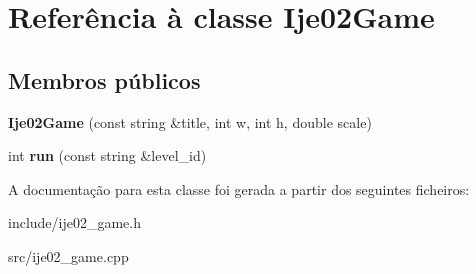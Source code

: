 \hypertarget{classIje02Game}{}\section{Referência à classe Ije02\+Game}
\label{classIje02Game}
\subsection*{Membros públicos}
\begin{DoxyCompactItemize}
\item 
\mbox{\label{classIje02Game_ab31ee909d3cb4344d166f4402467bf93}} 
{\bfseries Ije02\+Game} (const string \&title, int w, int h, double scale)
\item 
\mbox{\label{classIje02Game_ac93c42997b7e79698960057d7c395990}} 
int {\bfseries run} (const string \&level\+\_\+id)
\end{DoxyCompactItemize}


A documentação para esta classe foi gerada a partir dos seguintes ficheiros\+:\begin{DoxyCompactItemize}
\item 
include/ije02\+\_\+game.\+h\item 
src/ije02\+\_\+game.\+cpp\end{DoxyCompactItemize}
